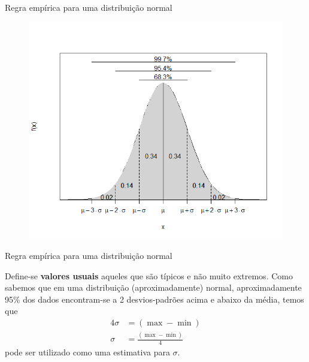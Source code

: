 \documentclass[14pt,aspectratio=1610]{beamer}
\begin{document}
	\begin{frame}{Regra empírica para uma distribuição normal}
		\begin{block}{}
			\justifying
			\begin{figure}
				\centering
				\includegraphics[scale=0.6]{figs/ICEmpirico.png}
			\end{figure}
			
		\end{block}
	\end{frame}
	
	\begin{frame}{Regra empírica para uma distribuição normal}
		\begin{block}{}
			\justifying
			Define-se \textbf{valores usuais} aqueles que são típicos e não muito extremos. Como sabemos que em uma distribuição (aproximadamente) normal, aproximadamente 95\% dos dados encontram-se a 2 desvios-padrões acima e
			abaixo da média, temos que
			\begin{align*}
				4\sigma &= (\max - \min) \\
				\sigma &= \frac{(\max - \min)}{4}
			\end{align*}
			pode ser utilizado como uma estimativa para $\sigma$.  
		\end{block}
	\end{frame}
	
\end{document}
